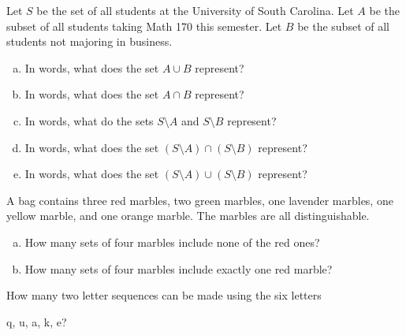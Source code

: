 \documentclass[12pt]{amsart}
\begin{document}
\begin{thm}[10 Points]\label{ex1}
  Let $S$ be the set of all students at the University of South Carolina.
  Let $A$ be the subset of all students taking Math 170 this semester.
  Let $B$ be the subset of all students not majoring in business.
  \begin{enumerate}[(a)]
  \item
    In words, what does the set $A \cup B$ represent?
    \vspace{1.5in}
  \item
    In words, what does the set $A \cap B$ represent?
    \vspace{1.5in}
  \item
    In words, what do the sets $S \setminus A$ and $S \setminus B$ represent?
    \vspace{1.5in}
  \item
    In words, what does the set $\left(S \setminus A\right) \cap \left(S \setminus B\right)$ represent?
    \vspace{1.5in}
  \item
    In words, what does the set $\left(S \setminus A\right) \cup \left(S \setminus B\right)$ represent?
  \end{enumerate}
  
\end{thm}

\newpage
\begin{thm}[20 Points]\label{ex2}
  A bag contains three red marbles, two green marbles, one lavender marbles, one yellow marble, and one orange marble.
  The marbles are all distinguishable.
  \begin{enumerate}[(a)]
  \item
    How many sets of four marbles include none of the red ones?
    \vspace{4in}
  \item
    How many sets of four marbles include exactly one red marble?
  \end{enumerate}  
\end{thm}

\newpage

\begin{thm}[12 Points]\label{ex3}
  How many two letter sequences can be made using the six letters 
  \begin{center}q, u, a, k, e?\end{center}
\end{thm}

\newpage
\end{document}
